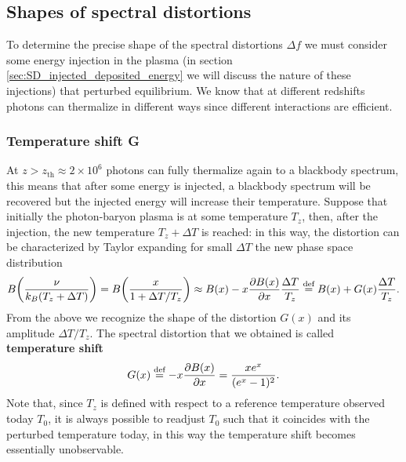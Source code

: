 \subsection{Shapes of spectral distortions}\label{sec:SD_shapes}
To determine the precise shape of the spectral distortions $\Delta f$ we must consider some energy injection in the plasma (in section \ref{sec:SD_injected_deposited_energy} we will discuss the nature of these injections) that perturbed equilibrium. We know that at different redshifts photons can thermalize in different ways since different interactions are efficient. 
\subsubsection{Temperature shift G}
At $z>z_\text{th}\approx2\times10^6$ photons can fully thermalize again to a blackbody spectrum, this means that after some energy is injected, a blackbody spectrum will be recovered but the injected energy will increase their temperature. Suppose that initially the photon-baryon plasma is at some temperature $T_z$, then, after the injection, the new temperature $T_z+\Delta T$ is reached: in this way, the distortion can be characterized by Taylor expanding for small $\Delta T$ the new phase space distribution 
$$B\bigg(\frac{\nu}{k_B(T_z+\Delta T)}\bigg)=B\bigg(\frac{x}{1+\Delta T/T_z}\bigg)\approx B(x)-x\frac{\partial B(x)}{\partial x}\frac{\Delta T}{T_z}\stackrel{\text{def}}{=} B(x)+G(x)\frac{\Delta T}{T_z}.$$
From the above we recognize the shape of the distortion $G(x)$ and its amplitude $\Delta T/T_z$. The spectral distortion that we obtained is called \textbf{temperature shift}
\begin{equation}
    \label{eq:SD_temperature_shift}
    G(x)\stackrel{\text{def}}{=}-x\frac{\partial B(x)}{\partial x}=\frac{xe^x}{(e^x-1)^2}.
\end{equation}
Note that, since $T_z$ is defined with respect to a reference temperature observed today $T_0$, it is always possible to readjust $T_0$ such that it coincides with the perturbed temperature today, in this way the temperature shift becomes essentially unobservable. 
